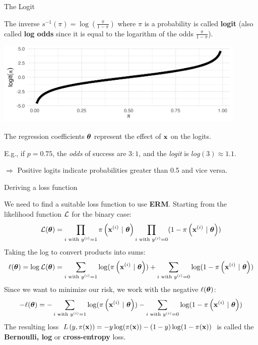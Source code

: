 \documentclass[11pt,compress,t,notes=noshow, xcolor=table]{beamer}
\begin{document}
\begin{vbframe}{The Logit}

The inverse $s^{-1}(\pi) = \log\left(\frac{\pi}{1 - \pi}\right)$ where $\pi$ is a probability is called \textbf{logit} (also called \textbf{log odds} since it is equal to the logarithm of the odds $\frac{\pi}{1-\pi}$).

\begin{center}
\includegraphics[width=0.9\textwidth]{figure/logit_function.png}
\end{center}

The regression coefficients $\bm{\theta}$ represent the effect of $\mathbf{x}$ on the logits.

\lz

\small{E.g., if $p = 0.75$, the \textit{odds} of success are $3:1$, and the \textit{logit} is $log(3) \approx 1.1$.}

\vspace{1em}

$\Rightarrow$ Positive logits indicate probabilities greater than 0.5 and vice versa.
\end{vbframe}

\begin{vbframe}{Deriving a loss function}

We need to find a suitable loss function to use \textbf{ERM}. Starting from the likelihood function $\mathcal{L}$ for the binary case:
$$
\mathcal{L}(\bm{\theta}) = \prod_{i \text{ with } y^{(i)} = 1} \pi\left(\mathbf{x}^{(i)} ~|~ \bm{\theta}\right) \prod_{i \text{ with } y^{(i)} = 0} (1-\pi\left(\mathbf{x}^{(i)} ~|~ \bm{\theta}\right))
$$
Taking the log to convert products into sums:
$$
\ell(\bm{\theta}) = \log \mathcal{L}(\bm{\theta}) = \sum_{i \text{ with } y^{(i)} = 1} \log(\pi\left(\mathbf{x}^{(i)} ~|~ \bm{\theta}\right)) + \sum_{i \text{ with } y^{(i)} = 0} \log(1-\pi\left(\mathbf{x}^{(i)} ~|~ \bm{\theta}\right))
$$
Since we want to minimize our risk, we work with the negative $\ell(\bm{\theta})$:
$$
- \ell(\bm{\theta}) = - \sum_{i \text{ with } y^{(i)} = 1} \log(\pi\left(\mathbf{x}^{(i)} ~|~ \bm{\theta}\right)) - \sum_{i \text{ with } y^{(i)} = 0} \log(1-\pi\left(\mathbf{x}^{(i)} ~|~ \bm{\theta}\right))
$$
The resulting loss $L\left(y, \pi(\mathbf{x})\right) = -y\log(\pi(\mathbf{x}))-(1-y)\log(1-\pi(\mathbf{x}))$ is called the \textbf{Bernoulli, log} or \textbf{cross-entropy} loss.
\end{vbframe}
\end{document}
